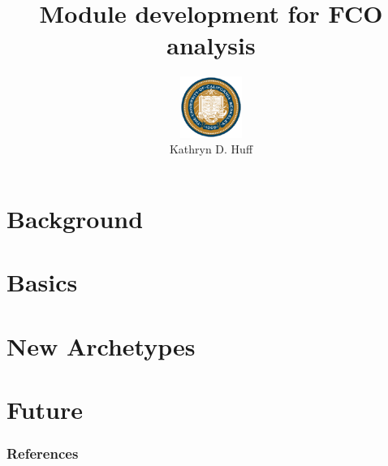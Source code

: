 \documentclass[serif]{beamer}
\title{Module development for FCO analysis}
\author[Kathryn D. Huff]{\includegraphics[height=2cm]{bk}\\Kathryn D. Huff}
\begin{document}
\maketitle


\section{Background}


\section{Basics}

\section{New Archetypes}




\section{Future}




\begin{frame}[allowframebreaks]
  \frametitle{References}
  
  {\footnotesize  }

\end{frame}

\end{document}
